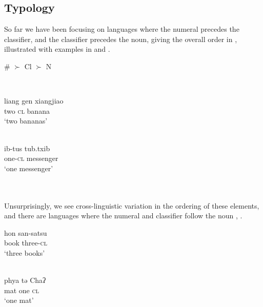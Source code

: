 \documentclass[output=paper
,modfonts
,nonflat]{langsci/langscibook}
\begin{document}
\subsection{Typology}

So far we have been focusing on languages where the numeral precedes the classifier, and the classifier precedes the noun, giving the overall order in , illustrated with examples in  and .

\begin{minipage}[t]{.5\linewidth}
\ea \label{ex:hall:48}
\# $\succ$ Cl $\succ$ N
\z
\end{minipage} \\

\begin{minipage}[t]{.5\linewidth}
\ea \label{ex:hall:49}
\gll liang gen xiangjiao \\
two \textsc{cl} banana \\
\glt `two bananas' \\
~ 
\z 
\end{minipage}
\begin{minipage}[t]{.5\linewidth}
\ea \label{ex:hall:50}
\gll
ib-tus tub.txib \\
one-\textsc{cl} messenger \\
\glt `one messenger' \\
~ 
\z
\end{minipage}\\

Unsurprisingly, we see cross-linguistic variation in the ordering of these elements, and there are languages where the numeral and classifier follow the noun , .\\

\begin{minipage}{.5\linewidth}
\ea \label{ex:hall:51}
\gll
hon san-satsu \\
book three-\textsc{cl} \\
\glt
`three books' \\
~ 
\z
\end{minipage}
\begin{minipage}{.5\linewidth}
\ea \label{ex:hall:52}
\gll
phya tə Chaʔ \\
mat one \textsc{cl} \\
\glt 
`one mat' \\
~ 
\z
\end{minipage}\\
\end{document}
